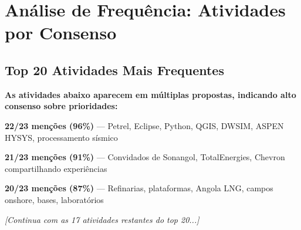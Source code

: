\documentclass[12pt,a4paper,oneside]{article}
\begin{document}
\vspace{1.2cm}


\newpage

\section{Análise de Frequência: Atividades por Consenso}

\subsection{Top 20 Atividades Mais Frequentes}

{\color{spe-secondary}\bfseries As atividades abaixo aparecem em múltiplas propostas, indicando alto consenso sobre prioridades:}

\vspace{1cm}

\begin{tcbraster}[raster columns=1, nobeforeafter]

\begin{tcolorbox}[
  enhanced,
  colframe=spe-accent,
  colback=highlight-yellow,
  title={\color{white}\bfseries 🥇~Workshops Técnicos},
  boxrule=1pt,
  arc=3pt
]
  \textbf{22/23 menções (96\%)} — Petrel, Eclipse, Python, QGIS, DWSIM, ASPEN HYSYS, processamento sísmico
\end{tcolorbox}

\begin{tcolorbox}[
  enhanced,
  colframe=spe-secondary,
  colback=highlight-blue,
  title={\color{white}\bfseries 🥈~Palestras com Profissionais},
  boxrule=1pt,
  arc=3pt
]
  \textbf{21/23 menções (91\%)} — Convidados de Sonangol, TotalEnergies, Chevron compartilhando experiências
\end{tcolorbox}

\begin{tcolorbox}[
  enhanced,
  colframe=spe-primary,
  colback=highlight-green,
  title={\color{white}\bfseries 🥉~Visitas Técnicas},
  boxrule=1pt,
  arc=3pt
]
  \textbf{20/23 menções (87\%)} — Refinarias, plataformas, Angola LNG, campos onshore, bases, laboratórios
\end{tcolorbox}

\end{tcbraster}

\vspace{0.8cm}

\textit{[Continua com as 17 atividades restantes do top 20...]}
\end{document}

